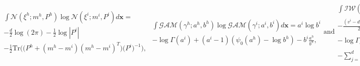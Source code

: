 \documentclass[journal]{IEEEtran}
\begin{document}
\begin{subequations}
\begin{multline}
    \int\mathcal{N}(\xi^{h};m^{h},P^{h})\log\mathcal{N}(\xi^i;m^i,P^i)d\mathbf{x} =\\ -\frac{d}{2}\log(2\pi)-\frac{1}{2}\log|P^i|\\-\frac{1}{2}\text{Tr}\bigg(\big(P^{h}+(m^{h}-m^i)(m^{h}-m^i)^T\big)\big(P^i\big)^{-1}\bigg),
    \end{multline}
    \begin{multline}
        \int\mathcal{GAM}(\gamma^{h};a^{h},b^{h})\log\mathcal{GAM}(\gamma^i;a^i,b^i)d\mathbf{x} = a^i\log b^i \\- \log\Gamma(a^i) + (a^i-1)(\psi_0(a^{h})-\log b^{h}) - b^i\frac{a^{h}}{b^{h}},
    \end{multline}
    \text{and}
    \begin{multline}
        \int\mathcal{IW}(\chi^{h};v^{h},V^{h})\log\mathcal{IW}(\chi^i;v^i,V^i)d\mathbf{x} =\\ -\frac{(v^i-d-1)d}{2}\log2 + \frac{v^i-d-1}{2}\log|V^i| \\- \log\Gamma_d\bigg(\frac{v^i-d-1}{2}\bigg) - \frac{v^i}{2}\bigg(\log|V^{h}|-d\log2\\-\sum_{j=1}^d\psi_0\bigg(\frac{v^{h}-d-j}{2}\bigg)\bigg) -\frac{1}{2}\text{Tr}\big((v^{h}-d-1)(V^{h})^{-1}V^i\big).
    \end{multline}
\end{subequations}




\end{document}
